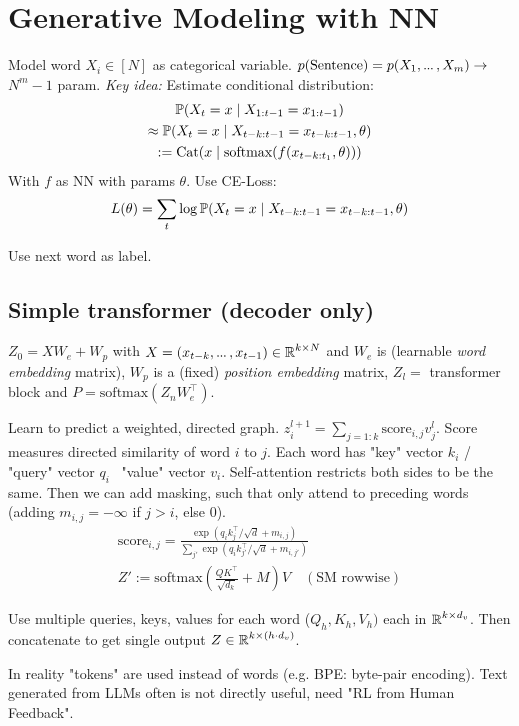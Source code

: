 \section{Generative Modeling with NN}
Model word \(X_i \in [N]\) as categorical variable. \(p(\text{Sentence}) = p(X_1, \sdots, X_m) \to\) \(N^m - 1\) param.
\textit{Key idea:} Estimate conditional distribution:
\begin{gather*}
  \P(X_t = x \mid X_{1:t-1} = x_{1:t-1}) \\ 
  \approx \P(X_t = x \mid X_{t-k:t-1} = x_{t-k:t-1}, \theta) \\
  := \cat(x \mid \text{softmax}(f(x_{t-k:t_1}, \theta)))
\end{gather*}
With \(f\) as NN with params \(\theta\). Use CE-Loss:
\[L(\theta) = \sum_t \log \P(X_t = x \mid X_{t-k:t-1} = x_{t-k:t-1}, \theta)\]

\begin{definition}
  Use next word as label.
\end{definition}

\subsection{Simple transformer (decoder only)}
\begin{definition}
  \(Z_0 = XW_e + W_p\) with \(X = (x_{t-k}, \sdots, x_{t-1}) \in \R^{k \times N}\) and \(W_e\) is (learnable \textit{word embedding} matrix), \(W_p\) is a (fixed) \textit{position embedding} matrix, \(Z_l = \) transformer block and \(P = \text{softmax}(Z_nW_e^\top)\).
\end{definition}

\begin{definition}
  Learn to predict a weighted, directed graph. \(z_i^{l+1} = \sum_{j=1:k} \text{score}_{i, j}v_j^l\). Score measures directed similarity of word \(i\) to \(j\).
  Each word has "key" vector \(k_i\) / "query" vector \(q_i\) \ "value" vector \(v_i\).
  Self-attention restricts both sides to be the same. Then we can add masking, such that only attend to preceding words (adding \(m_{i, j} = - \infty\) if \(j > i\), else 0). \vspace{-11pt}
  \begin{gather*}
    \text{score}_{i, j} = \frac{\exp(q_i k_j^\top / \sqrt{d} + m_{i,j})}{\sum_{j'}\exp(q_i k_{j'}^\top / \sqrt{d} + m_{i,j'})} \\
    Z' := \text{softmax}\left(\frac{QK^\top}{\sqrt{d_k}} + M\right)V \quad (\text{SM rowwise})
  \end{gather*}
\end{definition}

\begin{definition}
  Use multiple queries, keys, values for each word (\(Q_h, K_h, V_h)\) each in \(\R^{k \times d_v}\). Then concatenate to get single output \(Z \in \R^{k \times (h\cdot d_v)}\).
\end{definition}

In reality "tokens" are used instead of words (e.g. BPE: byte-pair encoding). Text generated from LLMs often is not directly useful, need "RL from Human Feedback".
